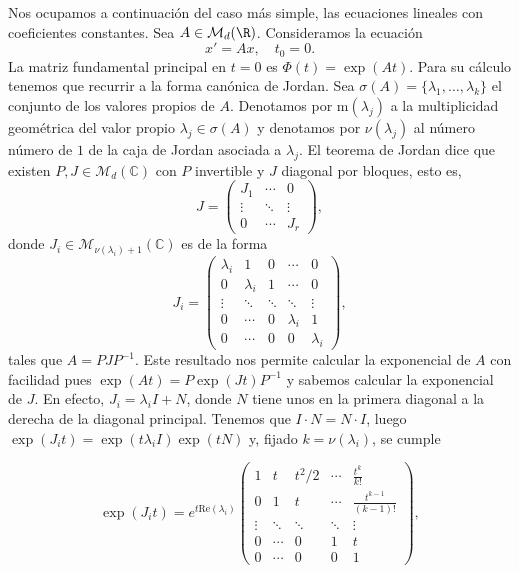 Nos ocupamos a continuación del caso más simple, las ecuaciones lineales con coeficientes
constantes.  Sea $A \in \mathcal{M}_d(\R)$. Consideramos la ecuación
\begin{equation}
  \label{eq:lineal:cons}
  x' = A x, \quad t_0 = 0.
  \tag{LHC}
\end{equation}
La matriz fundamental principal en $t = 0$ es $\Phi(t) = \exp(At)$. Para su cálculo tenemos que
recurrir a la forma canónica de Jordan. Sea $\sigma(A) = \{\lambda_1, \ldots, \lambda_k\}$ el
conjunto de los valores propios de $A$. Denotamos por $\mathrm{m}(\lambda_j)$ a la multiplicidad
geométrica del valor propio $\lambda_j \in \sigma(A)$ y denotamos por $\nu(\lambda_j)$ al número
número de $1$ de la caja de Jordan asociada a $\lambda_j$. El teorema de Jordan dice que existen
$P, J \in \mathcal{M}_d(\mathbb{C})$ con $P$ invertible y $J$ diagonal por bloques, esto es,
\begin{equation}
  \label{eq:jordan}
  J = \left(
    \begin{matrix}
      J_1 & \cdots & 0 \\
      \vdots  & \ddots  & \vdots \\
      0 & \cdots & J_r
    \end{matrix}
  \right),
\end{equation}
donde $J_i \in \mathcal{M}_{\nu(\lambda_i)+1}(\mathbb{C})$ es de la forma
\begin{equation}
  \label{eq:jordan:bloque}
  J_i = \left(
    \begin{matrix}
      \lambda_i & 1 & 0 & \cdots & 0 \\
      0 & \lambda_i & 1 & \cdots & 0 \\
      \vdots  & \ddots & \ddots  & \ddots & \vdots \\
      0 &  \cdots & 0 & \lambda_i & 1 \\
      0 & \cdots & 0  & 0 & \lambda_i
    \end{matrix}
  \right),
\end{equation}
tales que $A = P J P^{-1}$. Este resultado nos permite calcular la exponencial de $A$ con facilidad
pues $\exp(At) = P \exp(Jt) P^{-1}$ y sabemos calcular la exponencial de $J$. En efecto,
$J_i = \lambda_i I + N$, donde $N$ tiene unos en la primera diagonal a la derecha de la diagonal
principal. Tenemos que $I \cdot N = N \cdot I$, luego $\exp(J_i t) = \exp(t \lambda_i I ) \exp(t N)$
y, fijado $k = \nu(\lambda_i)$, se cumple

\begin{equation}
  \label{eq:jordan:bloque}
  \exp(J_i t) = e^{t \mathrm{Re}(\lambda_i)} \left(
    \begin{matrix}
      1 & t & t^2 / 2 & \cdots & \frac{t^k}{k!} \\
      0 & 1 & t & \cdots & \frac{t^{k-1}}{(k-1)!} \\
      \vdots  & \ddots & \ddots  & \ddots & \vdots \\
      0 & \cdots & 0 & 1 & t \\
      0 & \cdots & 0 & 0 & 1
    \end{matrix}
  \right),
\end{equation}


